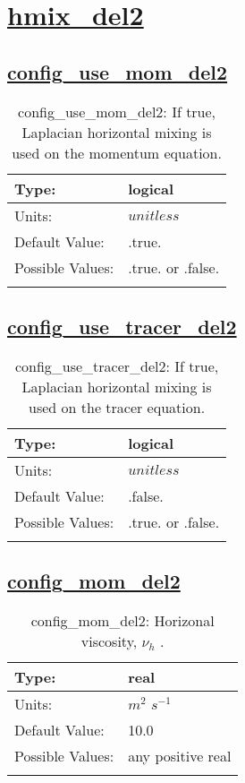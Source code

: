 \section[hmix\_del2]{\hyperref[sec:nm_tab_hmix_del2]{hmix\_del2}}
\label{sec:nm_sec_hmix_del2}
\subsection[config\_use\_mom\_del2]{\hyperref[sec:nm_tab_hmix_del2]{config\_use\_mom\_del2}}
\label{subsec:nm_sec_config_use_mom_del2}
\begin{center}
\begin{longtable}{| p{2.0in} | p{4.0in} |}
    \hline
    Type: & logical \\
    \hline
    Units: & $unitless$ \\
    \hline
    Default Value: & .true. \\
    \hline
    Possible Values: & .true. or .false. \\
    \hline
    \caption{config\_use\_mom\_del2: If true, Laplacian horizontal mixing is used on the momentum equation.}
\end{longtable}
\end{center}
\subsection[config\_use\_tracer\_del2]{\hyperref[sec:nm_tab_hmix_del2]{config\_use\_tracer\_del2}}
\label{subsec:nm_sec_config_use_tracer_del2}
\begin{center}
\begin{longtable}{| p{2.0in} | p{4.0in} |}
    \hline
    Type: & logical \\
    \hline
    Units: & $unitless$ \\
    \hline
    Default Value: & .false. \\
    \hline
    Possible Values: & .true. or .false. \\
    \hline
    \caption{config\_use\_tracer\_del2: If true, Laplacian horizontal mixing is used on the tracer equation.}
\end{longtable}
\end{center}
\subsection[config\_mom\_del2]{\hyperref[sec:nm_tab_hmix_del2]{config\_mom\_del2}}
\label{subsec:nm_sec_config_mom_del2}
\begin{center}
\begin{longtable}{| p{2.0in} | p{4.0in} |}
    \hline
    Type: & real \\
    \hline
    Units: & $m^2$ $s^{-1}$ \\
    \hline
    Default Value: & 10.0 \\
    \hline
    Possible Values: & any positive real \\
    \hline
    \caption{config\_mom\_del2:  Horizonal viscosity,  $\nu_h$ .}
\end{longtable}
\end{center}
